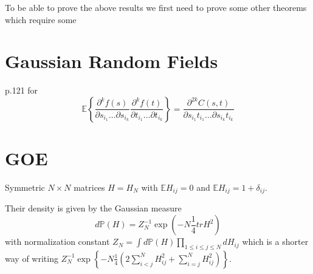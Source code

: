 To be able to prove the above results we first need to prove some other theorems which require some 

\section{Gaussian Random Fields}
\cite{Adler07} p.121 for \begin{equation}
	\mathbb E\left\{\frac{\partial^k f(s)}{\partial s_{i_1}\dots\partial s_{i_k}} \frac{\partial^k f(t)}{\partial t_{i_1}\dots\partial t_{i_k}}\right\}=\frac{\partial^{2k} C(s,t)}{\partial s_{i_1}t_{i_1}\dots\partial s_{i_k}t_{i_k}}
\end{equation}

\section{GOE}
\begin{definition}
	Symmetric $N\times N$ matrices $H=H_N$ with $\mathbb E H_{ij}=0$ and $\mathbb E H_{ij}=1+\delta_{ij}$.
\end{definition}
\begin{remark}
	Their density is given by the Gaussian measure
	\begin{equation}
		d\mathbb P(H)=Z_N^{-1}\exp\left(-N\frac{1}{4}tr H^2\right)
	\end{equation}
	with normalization constant $Z_N=\int d\mathbb P(H)\prod_{1\leq i\leq j\leq N} dH_{ij}$ which is a shorter way of writing $Z_N^{-1}\exp\left\{-N\frac{1}{4}\left(2\sum_{i<j}^N H_{ij}^2+\sum_{i=j}^N H_{ij}^2\right)\right\}$.
\end{remark}

